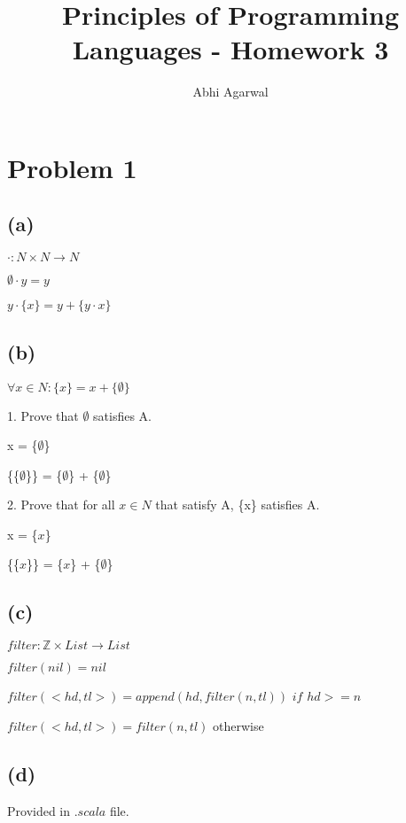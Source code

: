 \documentclass[11pt, oneside]{article}
\title{Principles of Programming Languages - Homework 3}
\author{Abhi Agarwal}
\date{}
\let\oldemptyset\emptyset
\let\emptyset\varnothing
\newcommand{\forceindent}{\leavevmode{\parindent=1.5em\indent}}
\begin{document}
\maketitle
\section{Problem 1}
\subsection*{(a)}

\forceindent \par $\cdot : N \times N \to N$
\par $\oldemptyset \cdot y = y$
\par $y \cdot \{x\} = y + \{y \cdot x\}$

\subsection*{(b)}

\forceindent \par $\forall x \in N : \{x\} = x + \{\oldemptyset\} $
\par 1. Prove that $\oldemptyset$ satisfies A.
\par x = \{$\oldemptyset$\}
\par \{\{$\oldemptyset$\}\} = \{$\oldemptyset$\} + \{$\oldemptyset$\}
\par 2. Prove that for all $x \in N$ that satisfy A, \{x\} satisfies A.
\par x = \{$x$\}
\par \{\{$x$\}\} = \{$x$\} + \{$\oldemptyset$\}

\subsection*{(c)}
\forceindent \par $filter : \mathbb Z \times List \to List$
\par $filter(nil) = nil$
\par $filter(<hd, tl>) = append(hd, filter(n, tl))$ $if$ $hd >= n$
\par $filter(<hd, tl>) = filter(n, tl)$ otherwise

\subsection*{(d)}
\par Provided in $.scala$ file.
\end{document}
